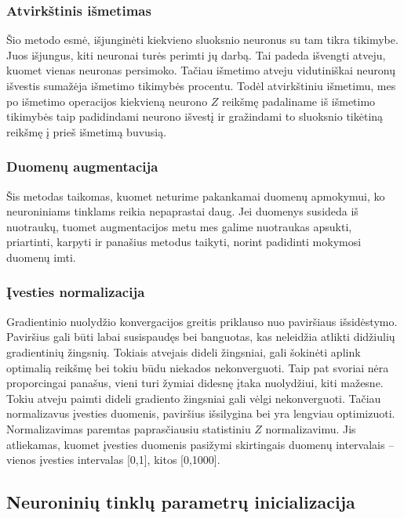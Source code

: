 \documentclass[a4paper, 12pt]{article}
\begin{document}
%
\subsubsection{Atvirkštinis išmetimas}
%
Šio metodo esmė, išjunginėti kiekvieno sluoksnio neuronus su tam tikra tikimybe. Juos išjungus, kiti neuronai turės perimti jų darbą. Tai padeda išvengti atveju, kuomet vienas neuronas persimoko. Tačiau išmetimo atveju vidutiniškai neuronų išvestis sumažėja išmetimo tikimybės procentu. Todėl atvirkštiniu išmetimu, mes po išmetimo operacijos kiekvieną neurono $Z$ reikšmę padaliname iš išmetimo tikimybės taip padidindami neurono išvestį ir gražindami to sluoksnio tikėtiną reikšmę į prieš išmetimą buvusią.



%
\subsubsection{Duomenų augmentacija}
%

Šis metodas taikomas, kuomet neturime pakankamai duomenų apmokymui, ko neuroniniams tinklams reikia nepaprastai daug. Jei duomenys susideda iš nuotraukų, tuomet augmentacijos metu mes galime nuotraukas apsukti, priartinti, karpyti ir panašius metodus taikyti, norint padidinti mokymosi duomenų imti.

%
\subsubsection{Įvesties normalizacija}
%

Gradientinio nuolydžio konvergacijos greitis priklauso nuo paviršiaus išsidėstymo. Paviršius gali būti labai susispaudęs bei banguotas, kas neleidžia atlikti didžiulių gradientinių žingsnių. Tokiais atvejais dideli žingsniai, gali šokinėti aplink optimalią reikšmę bei tokiu būdu niekados nekonverguoti. Taip pat svoriai nėra proporcingai panašus, vieni turi žymiai didesnę įtaka nuolydžiui, kiti mažesne. Tokiu atveju paimti dideli gradiento žingsniai gali vėlgi nekonverguoti. Tačiau normalizavus įvesties duomenis, paviršius išsilygina bei yra lengviau optimizuoti. Normalizavimas paremtas paprasčiausiu statistiniu $Z$ normalizavimu. Jis atliekamas, kuomet įvesties duomenis pasižymi skirtingais duomenų intervalais – vienos įvesties intervalas [0,1], kitos [0,1000].

%
\subsection{Neuroninių tinklų parametrų inicializacija}
%
\end{document}
